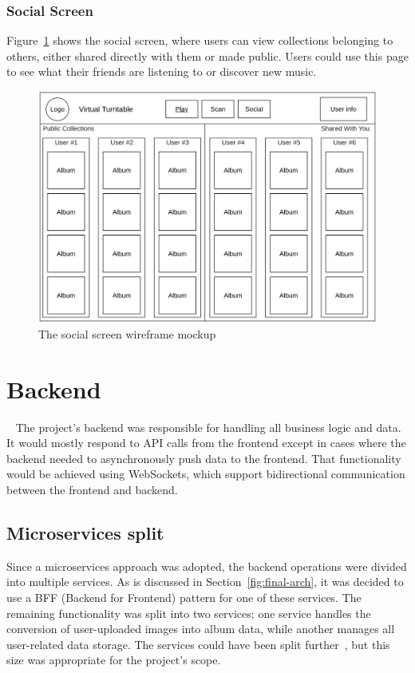 \subsubsection{Social Screen}
Figure~\ref{fig:social_screen_mockup} shows the social screen, where users can view collections belonging to others, either shared directly with them or made public. Users could use this page to see what their friends are listening to or discover new music.

\begin{figure} [H]
    \centering
    \includegraphics[width=0.6\linewidth]{figures/social_screen_mockup.png}
    \caption{The social screen wireframe mockup}
    \label{fig:social_screen_mockup}
\end{figure}

\section{Backend}~\label{sec:backend-design}
The project's backend was responsible for handling all business logic and data. It would mostly respond to API calls from the frontend except in cases where the backend needed to asynchronously push data to the frontend. That functionality would be achieved using WebSockets, which support bidirectional communication between the frontend and backend.

\subsection{Microservices split}
Since a microservices approach was adopted, the backend operations were divided into multiple services. As is discussed in Section~\ref{fig:final-arch}, it was decided to use a BFF (Backend for Frontend) pattern for one of these services. The remaining functionality was split into two services; one service handles the conversion of user-uploaded images into album data, while another manages all user-related data storage. The services could have been split further~\cite{7030212}, but this size was appropriate for the project's scope.

